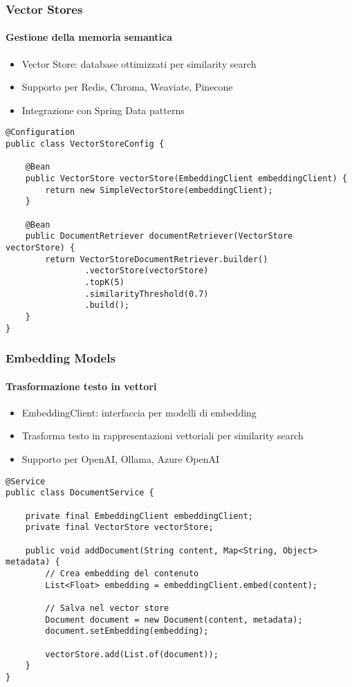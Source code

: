 \begin{frame}[t,fragile] \frametitle{Vector Stores}
	{\small
		\framesubtitle{Gestione della memoria semantica}
		\begin{itemize}[leftmargin=10pt,align=right]
			\onslide<2->\item[\alert{\faHandORight}] \alert{Vector Store:} database ottimizzati per similarity search
			\onslide<3->\item[\alert{\faHandORight}] Supporto per \alert{Redis}, \alert{Chroma}, \alert{Weaviate}, \alert{Pinecone}
			\onslide<4->\item[\alert{\faHandORight}] Integrazione con \alert{Spring Data} patterns
		\end{itemize}
		\vspace*{.3cm}
\begin{verbatim}
@Configuration
public class VectorStoreConfig {
    
    @Bean
    public VectorStore vectorStore(EmbeddingClient embeddingClient) {
        return new SimpleVectorStore(embeddingClient);
    }
    
    @Bean 
    public DocumentRetriever documentRetriever(VectorStore vectorStore) {
        return VectorStoreDocumentRetriever.builder()
                .vectorStore(vectorStore)
                .topK(5)
                .similarityThreshold(0.7)
                .build();
    }
}
\end{verbatim}
	}
\end{frame}
%
\begin{frame}[t,fragile] \frametitle{Embedding Models}
	{\small
		\framesubtitle{Trasformazione testo in vettori}
		\begin{itemize}[leftmargin=10pt,align=right]
			\onslide<2->\item[\alert{\faHandORight}] \alert{EmbeddingClient:} interfaccia per modelli di embedding
			\onslide<3->\item[\alert{\faHandORight}] Trasforma testo in \alert{rappresentazioni vettoriali} per similarity search
			\onslide<4->\item[\alert{\faHandORight}] Supporto per \alert{OpenAI}, \alert{Ollama}, \alert{Azure OpenAI}
		\end{itemize}
		\vspace*{.3cm}
\begin{verbatim}
@Service
public class DocumentService {
    
    private final EmbeddingClient embeddingClient;
    private final VectorStore vectorStore;
    
    public void addDocument(String content, Map<String, Object> metadata) {
        // Crea embedding del contenuto
        List<Float> embedding = embeddingClient.embed(content);
        
        // Salva nel vector store
        Document document = new Document(content, metadata);
        document.setEmbedding(embedding);
        
        vectorStore.add(List.of(document));
    }
}
\end{verbatim}
	}
\end{frame}
%
